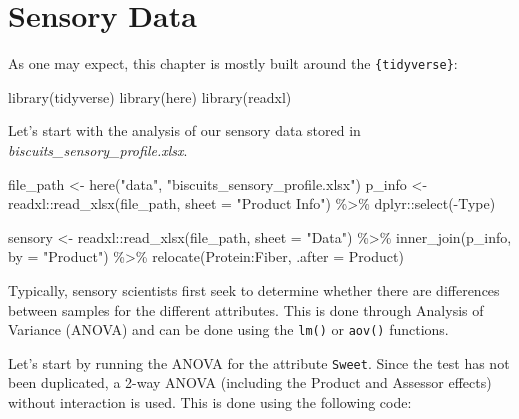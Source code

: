 \documentclass[
]{krantz}
\makeatletter
\newenvironment{Shaded}{\begin{snugshade}}{\end{snugshade}}
\newcommand{\AttributeTok}[1]{\textcolor[rgb]{0.61,0.61,0.61}{#1}}
\newcommand{\FunctionTok}[1]{\textcolor[rgb]{0,0,0}{#1}}
\newcommand{\NormalTok}[1]{#1}
\newcommand{\OtherTok}[1]{\textcolor[rgb]{0.37,0.37,0.37}{#1}}
\newcommand{\SpecialCharTok}[1]{\textcolor[rgb]{0,0,0}{#1}}
\newcommand{\StringTok}[1]{\textcolor[rgb]{0.5,0.5,0.5}{#1}}
\newenvironment{kframe}{%
\medskip{}
\setlength{\fboxsep}{.8em}
 \def\at@end@of@kframe{}%
 \ifinner\ifhmode%
  \def\at@end@of@kframe{\end{minipage}}%
  \begin{minipage}{\columnwidth}%
 \fi\fi%
 \def\FrameCommand##1{\hskip\@totalleftmargin \hskip-\fboxsep
 \colorbox{shadecolor}{##1}\hskip-\fboxsep
     \hskip-\linewidth \hskip-\@totalleftmargin \hskip\columnwidth}%
 \MakeFramed {\advance\hsize-\width
   \@totalleftmargin\z@ \linewidth\hsize
   \@setminipage}}%
 {\par\unskip\endMakeFramed%
 \at@end@of@kframe}
\renewenvironment{Shaded}{\begin{kframe}}{\end{kframe}}
\makeatother
\begin{document}
\hypertarget{sensory-analysis}{%
\section{Sensory Data}\label{sensory-analysis}}

As one may expect, this chapter is mostly built around the \texttt{\{tidyverse\}}:

\begin{Shaded}
\begin{Highlighting}[]
\FunctionTok{library}\NormalTok{(tidyverse)}
\FunctionTok{library}\NormalTok{(here)}
\FunctionTok{library}\NormalTok{(readxl)}
\end{Highlighting}
\end{Shaded}

Let's start with the analysis of our sensory data stored in \emph{biscuits\_sensory\_profile.xlsx}.

\begin{Shaded}
\begin{Highlighting}[]
\NormalTok{file\_path }\OtherTok{\textless{}{-}} \FunctionTok{here}\NormalTok{(}\StringTok{"data"}\NormalTok{, }\StringTok{"biscuits\_sensory\_profile.xlsx"}\NormalTok{)}
\NormalTok{p\_info }\OtherTok{\textless{}{-}}\NormalTok{ readxl}\SpecialCharTok{::}\FunctionTok{read\_xlsx}\NormalTok{(file\_path, }\AttributeTok{sheet =} \StringTok{"Product Info"}\NormalTok{) }\SpecialCharTok{\%\textgreater{}\%}
\NormalTok{  dplyr}\SpecialCharTok{::}\FunctionTok{select}\NormalTok{(}\SpecialCharTok{{-}}\NormalTok{Type)}

\NormalTok{sensory }\OtherTok{\textless{}{-}}\NormalTok{ readxl}\SpecialCharTok{::}\FunctionTok{read\_xlsx}\NormalTok{(file\_path, }\AttributeTok{sheet =} \StringTok{"Data"}\NormalTok{) }\SpecialCharTok{\%\textgreater{}\%}
  \FunctionTok{inner\_join}\NormalTok{(p\_info, }\AttributeTok{by =} \StringTok{"Product"}\NormalTok{) }\SpecialCharTok{\%\textgreater{}\%}
  \FunctionTok{relocate}\NormalTok{(Protein}\SpecialCharTok{:}\NormalTok{Fiber, }\AttributeTok{.after =}\NormalTok{ Product)}
\end{Highlighting}
\end{Shaded}

Typically, sensory scientists first seek to determine whether there are differences between samples for the different attributes. This is done through Analysis of Variance (ANOVA) and can be done using the \texttt{lm()} or \texttt{aov()} functions.

Let's start by running the ANOVA for the attribute \texttt{Sweet}. Since the test has not been duplicated, a 2-way ANOVA (including the Product and Assessor effects) without interaction is used. This is done using the following code:
\end{document}
